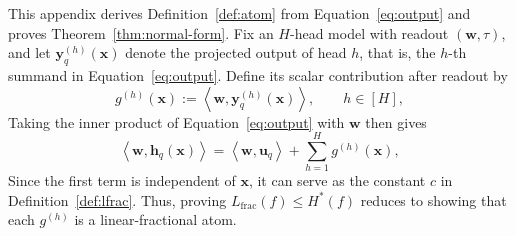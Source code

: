 \documentclass{article}
\theoremstyle{definition}
\theoremstyle{plain}
\newcommand{\hstar}{H^{\ast}}
\begin{document}
This appendix derives Definition~\ref{def:atom} from Equation~\eqref{eq:output} and proves Theorem~\ref{thm:normal-form}. Fix an $H$-head model with readout $(\mathbf{w},\tau)$, and let $\mathbf{y}_q^{(h)}(\mathbf{x})$ denote the projected output of head $h$, that is, the $h$-th summand in Equation~\eqref{eq:output}. Define its scalar contribution after readout by
\begin{equation}
g^{(h)}(\mathbf{x})
:=\left\langle\mathbf{w},\mathbf{y}_q^{(h)}(\mathbf{x})\right\rangle,
\qquad h\in[H],
\label{eq:normal-head-contribution}
\end{equation}
Taking the inner product of Equation~\eqref{eq:output} with $\mathbf{w}$ then gives
\begin{equation}
\left\langle\mathbf{w},\mathbf{h}_q(\mathbf{x})\right\rangle
=\left\langle\mathbf{w},\mathbf{u}_q\right\rangle
+\sum_{h=1}^{H}g^{(h)}(\mathbf{x}),
\label{eq:normal-score-decomposition}
\end{equation}
Since the first term is independent of $\mathbf{x}$, it can serve as the constant $c$ in Definition~\ref{def:lfrac}. Thus, proving $L_{\mathrm{frac}}(f)\leq\hstar(f)$ reduces to showing that each $g^{(h)}$ is a linear-fractional atom.
\end{document}
